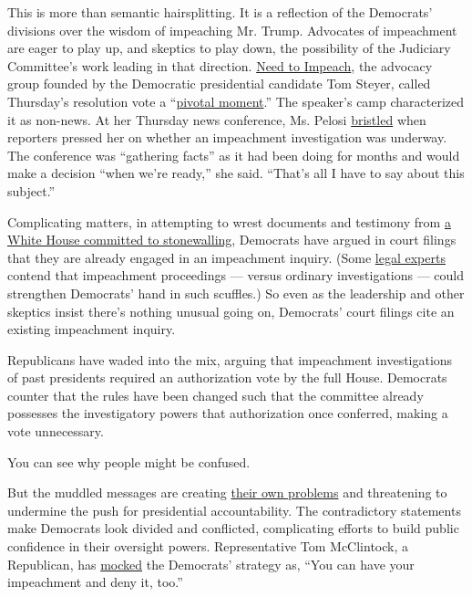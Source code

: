 This is more than semantic hairsplitting. It is a reflection of the
Democrats' divisions over the wisdom of impeaching Mr. Trump. Advocates
of impeachment are eager to play up, and skeptics to play down, the
possibility of the Judiciary Committee's work leading in that direction.
\href{https://www.needtoimpeach.com}{Need to Impeach}, the advocacy
group founded by the Democratic presidential candidate Tom Steyer,
called Thursday's resolution vote a
``\href{https://thehill.com/homenews/house/460793-dems-impeachment-message-leads-to-plenty-of-head-scratching}{pivotal
moment}.'' The speaker's camp characterized it as non-news. At her
Thursday news conference, Ms. Pelosi
\href{https://abcnews.go.com/Politics/pelosi-exasperated-repeated-impeachment-questions/story?id=65564443}{bristled}
when reporters pressed her on whether an impeachment investigation was
underway. The conference was ``gathering facts'' as it had been doing
for months and would make a decision ``when we're ready,'' she said.
``That's all I have to say about this subject.''

Complicating matters, in attempting to wrest documents and testimony
from
\href{https://www.nytimes3xbfgragh.onion/2019/04/25/us/politics/trump-white-house-democrats.html}{a
White House committed to stonewalling}, Democrats have argued in court
filings that they are already engaged in an impeachment inquiry. (Some
\href{https://beta.washingtonpost.com/opinions/2019/04/24/how-trump-is-making-his-own-impeachment-more-likely/}{legal
experts} contend that impeachment proceedings --- versus ordinary
investigations --- could strengthen Democrats' hand in such scuffles.)
So even as the leadership and other skeptics insist there's nothing
unusual going on, Democrats' court filings cite an existing impeachment
inquiry.

Republicans have waded into the mix, arguing that impeachment
investigations of past presidents required an authorization vote by the
full House. Democrats counter that the rules have been changed such that
the committee already possesses the investigatory powers that
authorization once conferred, making a vote unnecessary.

You can see why people might be confused.

But the muddled messages are creating
\href{https://www.politico.com/story/2019/09/10/impeachment-democrats-trump-1488401}{their
own problems} and threatening to undermine the push for presidential
accountability. The contradictory statements make Democrats look divided
and conflicted, complicating efforts to build public confidence in their
oversight powers. Representative Tom McClintock, a Republican, has
\href{https://www.cnn.com/videos/tv/2019/09/12/lead-manu-raju-live-jake-tapper.cnn}{mocked}
the Democrats' strategy as, ``You can have your impeachment and deny it,
too.''

